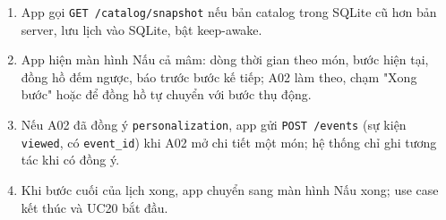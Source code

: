 \begin{enumerate}
\item App gọi {\small\texttt{GET /\allowbreak{}\allowbreak{}catalog/\allowbreak{}\allowbreak{}snapshot}} nếu bản catalog trong SQLite cũ hơn bản server, lưu lịch vào SQLite, bật keep-\allowbreak{}awake.
\item App hiện màn hình Nấu cả mâm: dòng thời gian theo món, bước hiện tại, đồng hồ đếm ngược, báo trước bước kế tiếp; A02 làm theo, chạm "Xong bước" hoặc để đồng hồ tự chuyển với bước thụ động.
\item Nếu A02 đã đồng ý {\small\texttt{personalization}}, app gửi {\small\texttt{POST /\allowbreak{}\allowbreak{}events}} (sự kiện {\small\texttt{viewed}}, có {\small\texttt{event\_\allowbreak{}\allowbreak{}id}}) khi A02 mở chi tiết một món; hệ thống chỉ ghi tương tác khi có đồng ý.
\item Khi bước cuối của lịch xong, app chuyển sang màn hình Nấu xong; use case kết thúc và UC20 bắt đầu.
\end{enumerate}

